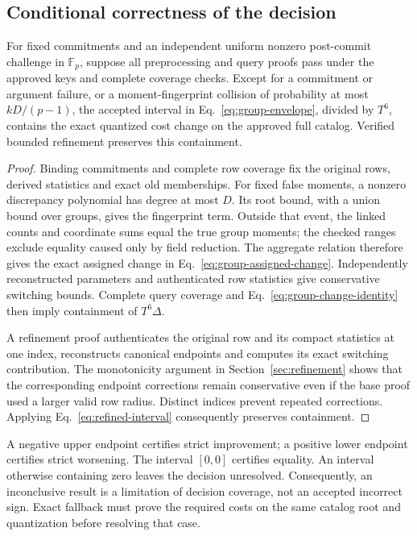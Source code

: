 \subsection{Conditional correctness of the decision}
\begin{proposition}
For fixed commitments and an independent uniform nonzero post-commit
challenge in $\mathbb F_p$, suppose all preprocessing and query proofs pass
under the approved keys and complete coverage checks. Except for a
commitment or argument failure, or a moment-fingerprint collision of
probability at most $kD/(p-1)$, the accepted interval in
Eq.~\eqref{eq:group-envelope}, divided by $T^6$, contains the exact quantized
cost change on the approved full catalog. Verified bounded refinement
preserves this containment.
\end{proposition}
\begin{proof}
Binding commitments and complete row coverage fix the original rows,
derived statistics and exact old memberships. For fixed false moments,
a nonzero discrepancy polynomial has degree at most $D$. Its root bound,
with a union bound over groups, gives the fingerprint term. Outside that
event, the linked counts and coordinate sums equal the true group moments;
the checked ranges exclude equality caused only by field reduction.
The aggregate relation therefore gives the exact assigned change in
Eq.~\eqref{eq:group-assigned-change}. Independently reconstructed parameters
and authenticated row statistics give conservative switching bounds.
Complete query coverage and Eq.~\eqref{eq:group-change-identity} then imply
containment of $T^6\Delta$.

A refinement proof authenticates the original row and its compact statistics
at one index, reconstructs canonical endpoints and computes its exact
switching contribution. The monotonicity argument in
Section~\ref{sec:refinement} shows that the corresponding endpoint
corrections remain conservative even if the base proof used a larger valid
row radius. Distinct indices prevent repeated corrections. Applying
Eq.~\eqref{eq:refined-interval} consequently preserves containment.
\end{proof}

A negative upper endpoint certifies strict improvement; a positive lower
endpoint certifies strict worsening. The interval $[0,0]$ certifies equality.
An interval otherwise containing zero leaves the decision unresolved.
Consequently, an inconclusive result is a limitation of decision coverage,
not an accepted incorrect sign. Exact fallback must prove the required
costs on the same catalog root and quantization before resolving that case.

